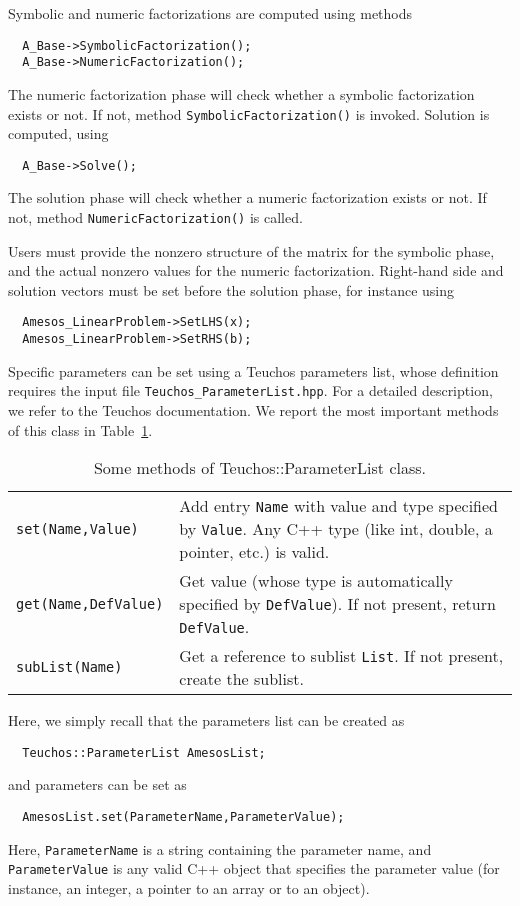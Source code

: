 \documentclass[11pt]{SANDreport}
\begin{document}
Symbolic and numeric factorizations are computed using methods
\begin{verbatim}
  A_Base->SymbolicFactorization();
  A_Base->NumericFactorization();
\end{verbatim}
The numeric factorization phase will check whether a symbolic
factorization exists or not. If not, method
\verb!SymbolicFactorization()! is invoked.  Solution is computed, using
\begin{verbatim}
  A_Base->Solve();
\end{verbatim}
The solution phase will check whether a numeric factorization exists or
not. If not, method \verb!NumericFactorization()! is called.

Users must provide the nonzero structure of the matrix for the symbolic
phase, and the actual nonzero values for the numeric
factorization. Right-hand side and solution vectors must be set before
the solution phase, for instance using
\begin{verbatim}
  Amesos_LinearProblem->SetLHS(x);
  Amesos_LinearProblem->SetRHS(b);
\end{verbatim}

Specific parameters can be set using a Teuchos parameters list, whose
definition requires the input file \verb!Teuchos_ParameterList.hpp!. For
a detailed description, we refer to the Teuchos documentation. We report
the most important methods of this class in Table~\ref{tab:teuchos}.

\begin{table}[htbp]
  \centering
  \begin{tabular}{| p{4cm} | p{10cm} |}
    \hline
    \verb!set(Name,Value)! & Add entry \verb!Name! with value and type
    specified by \verb!Value!. Any C++ type (like int, double, a
    pointer, etc.) is valid. \\
    \verb!get(Name,DefValue)! & Get value (whose type is automatically
    specified by \verb!DefValue!). If not present, return
    \verb!DefValue!. \\
    \verb!subList(Name)! & Get a reference to sublist \verb!List!. If not
    present, create the sublist. \\
    \hline
  \end{tabular}
  \caption{Some methods of Teuchos::ParameterList class.}
  \label{tab:teuchos}
\end{table}


Here, we simply recall that the
parameters list can be created as
\begin{verbatim}
  Teuchos::ParameterList AmesosList;
\end{verbatim}
and parameters can be set as
\begin{verbatim}
  AmesosList.set(ParameterName,ParameterValue);
\end{verbatim}
Here, \verb!ParameterName! is a string containing the parameter name,
and \verb!ParameterValue! is any valid C++ object that specifies the
parameter value (for instance, an integer, a pointer to an array or to
an object).
\end{document}
